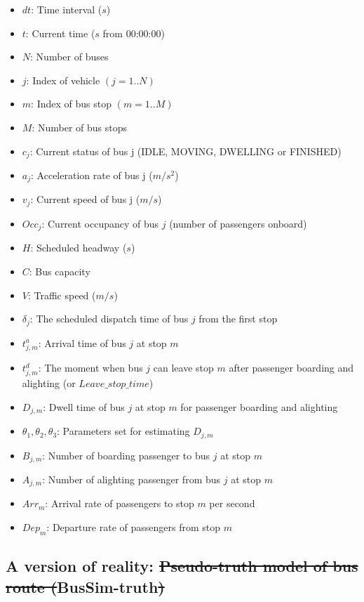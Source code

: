 \documentclass[11pt]{article}
\providecommand{\DIFaddtex}[1]{{\protect\color{blue}\uwave{#1}}} %
\providecommand{\DIFdeltex}[1]{{\protect\color{red}\sout{#1}}}                      %
\providecommand{\DIFaddbegin}{} %
\providecommand{\DIFaddend}{} %
\providecommand{\DIFdelbegin}{} %
\providecommand{\DIFdelend}{} %
\providecommand{\DIFadd}[1]{\texorpdfstring{\DIFaddtex{#1}}{#1}} %
\providecommand{\DIFdel}[1]{\texorpdfstring{\DIFdeltex{#1}}{}} %
\newcommand{\DIFscaledelfig}{0.5}
\newlength{\DIFdelgraphicswidth} %
\newlength{\DIFdelgraphicsheight} %
\newcommand{\DIFaddincludegraphics}[2][]{{\color{blue}\fbox{\DIFOincludegraphics[#1]{#2}}}} %
\newcommand{\DIFdelincludegraphics}[2][]{%
\sbox{\DIFdelgraphicsbox}{\DIFOincludegraphics[#1]{#2}}%
\settoboxwidth{\DIFdelgraphicswidth}{\DIFdelgraphicsbox} %
\settoboxtotalheight{\DIFdelgraphicsheight}{\DIFdelgraphicsbox} %
\scalebox{\DIFscaledelfig}{%
\parbox[b]{\DIFdelgraphicswidth}{\usebox{\DIFdelgraphicsbox}\\[-\baselineskip] \rule{\DIFdelgraphicswidth}{0em}}\llap{\resizebox{\DIFdelgraphicswidth}{\DIFdelgraphicsheight}{%
\setlength{\unitlength}{\DIFdelgraphicswidth}%
\begin{picture}(1,1)%
\thicklines\linethickness{2pt} %
{\color[rgb]{1,0,0}\put(0,0){\framebox(1,1){}}}%
{\color[rgb]{1,0,0}\put(0,0){\line( 1,1){1}}}%
{\color[rgb]{1,0,0}\put(0,1){\line(1,-1){1}}}%
\end{picture}%
}\hspace*{3pt}}} %
} %
\DeclareRobustCommand{\DIFaddbegin}{\DIFOaddbegin \let\includegraphics\DIFaddincludegraphics} %
\DeclareRobustCommand{\DIFaddend}{\DIFOaddend \let\includegraphics\DIFOincludegraphics} %
\DeclareRobustCommand{\DIFdelbegin}{\DIFOdelbegin \let\includegraphics\DIFdelincludegraphics} %
\DeclareRobustCommand{\DIFdelend}{\DIFOaddend \let\includegraphics\DIFOincludegraphics} %
\begin{document}
\DIFaddend \label{s:Notation}
\begin{itemize}
    \item $dt$: Time interval ($s$)
    \item $t$: Current time ($s$ from 00:00:00)
    \item $N$: Number of buses
	\item $j$: Index of vehicle $(j=1..N)$
	\item $m$: Index of bus stop $(m=1..M)$
	\item $M$: Number of bus stops
	\item $c_j$: Current status of bus j (IDLE, MOVING, DWELLING or FINISHED)
	\item $a_j$: Acceleration rate of bus j ($m/s^2$)
	\item $v_j$: Current speed of bus j ($m/s$)
	\item $Occ_{j}$: Current occupancy of bus $j$ (number of passengers onboard)
	\item $H$: Scheduled headway ($s$)
	\item $C$: Bus capacity
	\item $V$: Traffic speed ($m/s$)
	\item $\delta_j$: The scheduled dispatch time of bus $j$ from the first stop
	\item $t^a_{j,m}$: Arrival time of bus $j$ at stop $m$
	\item $t^d_{j,m}$: The moment when bus $j$ can leave stop $m$ after passenger boarding and alighting (or $Leave\_stop\_time$)
    \item $D_{j,m}$: Dwell time of bus $j$ at stop $m$ for passenger boarding and alighting
	\item $\theta_1,\theta_2,\theta_3$: Parameters set for estimating $D_{j,m}$
	\item $B_{j,m}$: Number of boarding passenger to bus $j$ at stop $m$
	\item $A_{j,m}$: Number of alighting passenger from bus $j$ at stop $m$
	\item $Arr_m$: Arrival rate of passengers to stop $m$ per second
	\item $Dep_m$: Departure rate of passengers from stop $m$

\end{itemize}

\subsection{A \DIFaddbegin \DIFadd{hypothetical }\DIFaddend version of reality: \DIFdelbegin \DIFdel{Pseudo-truth model of bus route (}\DIFdelend BusSim-truth\DIFdelbegin \DIFdel{)}\DIFdelend }
\end{document}
